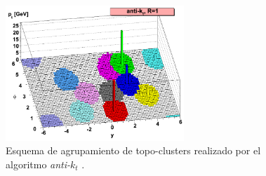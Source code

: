 \begin{figure}
\centering
  \includegraphics[width=0.6\textwidth]{images/objects/antikt.png}
\caption{Esquema de agrupamiento de topo-clusters realizado por el algoritmo \textit{anti-$k_t$} \cite{Cacciari:2008gp}.}
  \label{antikt}
\end{figure}

